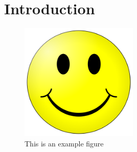 \setlength{\parindent}{0pt}
\chapter{Introduction}
\label{chap:introduction}
\lipsum[1]
\begin{figure}
    \centering
    \includegraphics[width=0.5\textwidth]{figures/smiley.png}
    \caption{This is an example figure}
    \label{fig:smiley}
\end{figure}
